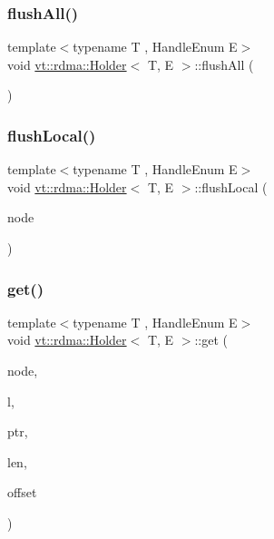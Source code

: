 \mbox{\label{structvt_1_1rdma_1_1_holder_a667a140d3db4f68da8af0f9d6533a88a}} 
\subsubsection{\texorpdfstring{flush\+All()}{flushAll()}}
{\footnotesize\ttfamily template$<$typename T , Handle\+Enum E$>$ \\
void \hyperlink{structvt_1_1rdma_1_1_holder}{vt\+::rdma\+::\+Holder}$<$ T, E $>$\+::flush\+All (\begin{DoxyParamCaption}{ }\end{DoxyParamCaption})}

\mbox{\label{structvt_1_1rdma_1_1_holder_a4b576d334034884d7c72b89310fd4f57}} 
\subsubsection{\texorpdfstring{flush\+Local()}{flushLocal()}}
{\footnotesize\ttfamily template$<$typename T , Handle\+Enum E$>$ \\
void \hyperlink{structvt_1_1rdma_1_1_holder}{vt\+::rdma\+::\+Holder}$<$ T, E $>$\+::flush\+Local (\begin{DoxyParamCaption}\item[{\hyperlink{namespacevt_a866da9d0efc19c0a1ce79e9e492f47e2}{vt\+::\+Node\+Type}}]{node }\end{DoxyParamCaption})}

\mbox{\label{structvt_1_1rdma_1_1_holder_a065715e0c91be9b411b490b740fc064a}} 
\subsubsection{\texorpdfstring{get()}{get()}}
{\footnotesize\ttfamily template$<$typename T , Handle\+Enum E$>$ \\
void \hyperlink{structvt_1_1rdma_1_1_holder}{vt\+::rdma\+::\+Holder}$<$ T, E $>$\+::get (\begin{DoxyParamCaption}\item[{\hyperlink{namespacevt_a866da9d0efc19c0a1ce79e9e492f47e2}{vt\+::\+Node\+Type}}]{node,  }\item[{\hyperlink{namespacevt_1_1rdma_ac5c20b41a653e520b6305d4d454ecb70}{Lock}}]{l,  }\item[{T $\ast$}]{ptr,  }\item[{std\+::size\+\_\+t}]{len,  }\item[{int}]{offset }\end{DoxyParamCaption})}

